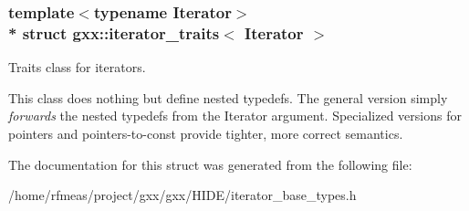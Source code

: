 \subsubsection*{template$<$typename Iterator$>$\\*
struct gxx\+::iterator\+\_\+traits$<$ Iterator $>$}

Traits class for iterators. 

This class does nothing but define nested typedefs. The general version simply {\itshape forwards} the nested typedefs from the Iterator argument. Specialized versions for pointers and pointers-\/to-\/const provide tighter, more correct semantics. 

The documentation for this struct was generated from the following file\+:\begin{DoxyCompactItemize}
\item 
/home/rfmeas/project/gxx/gxx/\+H\+I\+D\+E/iterator\+\_\+base\+\_\+types.\+h\end{DoxyCompactItemize}

